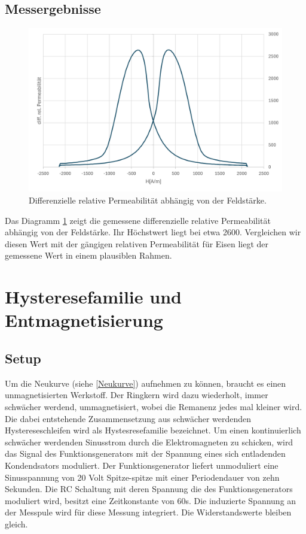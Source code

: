 \documentclass[a4paper,twoside,12pt,DIV=13,BCOR=5mm,numbers=noenddot,cleardoublepage=empty]{scrbook}
\begin{document}
        \subsection{Messergebnisse}
        \begin{figure}
          \centering
          \includegraphics[width=0.9\linewidth]{pictures/Permeabilitaet.png}
          \caption{Differenzielle relative Permeabilit\"at abh\"angig von der Feldst\"arke.}
          \label{fig:perm}
        \end{figure}
        Das Diagramm \ref{fig:perm} zeigt die gemessene differenzielle relative Permeabilit\"at abh\"angig von der Feldst\"arke. Ihr H\"ochstwert liegt bei etwa 2600. 
        Vergleichen wir diesen Wert mit der g\"angigen relativen Permeabilit\"at f\"ur Eisen liegt der gemessene Wert in einem plausiblen Rahmen.
        
        \section{Hysteresefamilie und Entmagnetisierung}
        \label{Entmag}
        \subsection{Setup}
        Um die Neukurve (siehe \ref{Neukurve}) aufnehmen zu k\"onnen, braucht es einen unmagnetisierten Werkstoff. 
        Der Ringkern wird dazu wiederholt, immer schw\"acher werdend, ummagnetisiert, wobei die Remanenz jedes mal kleiner wird.
        Die dabei entstehende Zusammensetzung aus schw\"acher werdenden Hystereseschleifen wird als Hystesresefamilie bezeichnet. 
        Um einen kontinuierlich schw\"acher werdenden Sinusstrom durch die Elektromagneten zu schicken, wird das Signal des Funktionsgenerators 
        mit der Spannung eines sich entladenden Kondendsators moduliert. Der Funktionsgenerator liefert unmoduliert eine Sinusspannung von 20 Volt Spitze-spitze mit einer Periodendauer von zehn Sekunden.
        Die RC Schaltung mit deren Spannung die des Funktionsgenerators moduliert wird, besitzt eine Zeitkonstante von 60s. Die induzierte Spannung an der Messpule wird f\"ur diese Messung integriert. 
        Die Widerstandswerte bleiben gleich.
\end{document}
